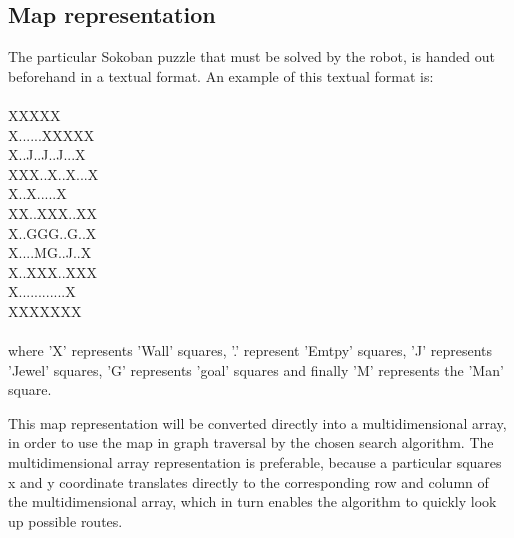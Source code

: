 \subsection{Map representation}
The particular Sokoban puzzle that must be solved by the robot, is handed out beforehand in a textual format. An example of this textual format is:
\\\\
XXXXX\\  
X......XXXXX\\ 
X..J..J..J...X\\  
XXX..X..X...X\\   
\hspace*{6 mm}X..X.....X\\  
\hspace*{3 mm}XX..XXX..XX\\        
\hspace*{3 mm}X..GGG..G..X\\ 
\hspace*{3 mm}X....MG..J..X\\  
\hspace*{3 mm}X..XXX..XXX\\     
\hspace*{3 mm}X............X\\
\hspace*{3 mm}XXXXXXX  
\\\\ 
where 'X' represents 'Wall' squares, '.' represent 'Emtpy' squares, 'J' represents 'Jewel' squares, 'G' represents 'goal' squares and finally 'M' represents the 'Man' square. 

This map representation will be converted directly into a multidimensional array, in order to use the map in graph traversal by the chosen search algorithm. The multidimensional array representation is preferable, because a particular squares x and y coordinate translates directly to the corresponding row and column of the multidimensional array, which in turn enables the algorithm to quickly look up possible routes.
